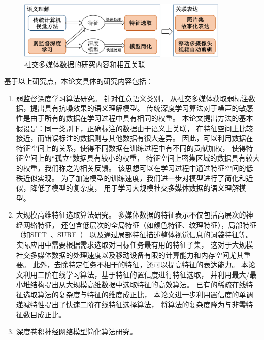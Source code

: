 \documentclass[doctor]{ustcthesis}
\begin{document}
\begin{figure}[t]
\centering
\includegraphics[width=0.9\textwidth]{correlation.pdf}
\caption{社交多媒体数据的研究内容和相互关联}
\label{fig:correlation}
\end{figure}

基于以上研究点，本论文具体的研究内容包括：
\vspace{-0.5em}
\begin{enumerate}\setlength{\itemsep}{0pt}
    \item 弱监督深度学习算法研究。 针对任意语义类别，
        从社交多媒体获取弱标注数据，提出具有抗噪效果的语义理解模型。
        传统深度学习算法对于噪声的敏感性是由于所有的数据在学习过程中具有相同的权重。
        本论文提出方法的基本假设是：同一类别下，正确标注的数据由于语义上关联，
        在特征空间上比较接近，而错误标注的数据则与其他数据有很大差异。
        因此，可以利用数据在特征空间上的关系，使得不同数据在训练过程中有不同的贡献加权，
        使得特征空间上的``孤立''数据具有较小的权重，
        特征空间上密集区域的数据具有较大的权重，我们称之为相关反馈。
        该思想可以在学习过程中通过特征空间的低秩近似实现。
        为了加速模型的训练速度，我们进一步对模型进行了简化和近似，降低了模型的复杂度，
        用于学习大规模社交多媒体数据的语义理解模型。
    \item 大规模高维特征选取算法研究。
        多媒体数据的特征表示不仅包括高层次的神经网络特征，
        还包含低层次的全局特征（如颜色特征、纹理特征），局部特征（如SIFT~\cite{lowe1999object}、SURF~\cite{bay2006surf}）
        以及通过局部特征描述整体视觉信息的词袋特征等。
        实际应用中需要根据需求选取对目标任务最有用的特征子集，
        这对于大规模社交多媒体数据的处理速度以及移动设备有限的计算能力和内存空间尤其重要。
        此外，去除特定任务不相干的特征，还可以提高特征的表达能力。
        本论文利用二阶在线学习算法，基于特征的置信度进行特征选取，
        并利用最大/最小堆结构提出从大规模高维数据中选取特征的高效算法。
        已有的稀疏在线特征选取算法的复杂度与特征的维度成正比，
        本论文进一步利用置信度的单调递减特性提出了快速二阶在线特征选择算法，
        将算法的复杂度降为与非零特征数目成正比。
    \item 深度卷积神经网络模型简化算法研究。

\end{enumerate}
\end{document}
